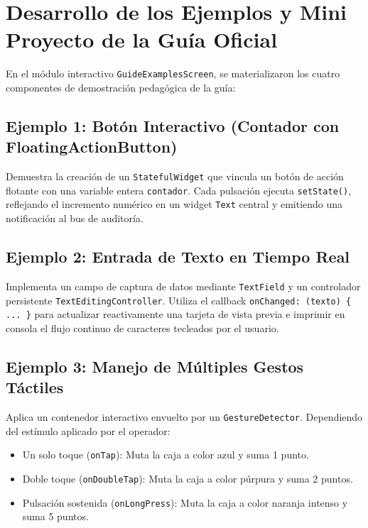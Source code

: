 \documentclass[12pt,a4paper]{article}
\begin{document}
  \section{Desarrollo de los Ejemplos y Mini Proyecto de la Guía Oficial}

  En el módulo interactivo \texttt{GuideExamplesScreen}, se materializaron los cuatro componentes de demostración pedagógica de la guía:

  \subsection{Ejemplo 1: Botón Interactivo (Contador con FloatingActionButton)}
  Demuestra la creación de un \texttt{StatefulWidget} que vincula un botón de acción flotante con una variable entera \texttt{contador}. Cada pulsación ejecuta \texttt{setState()}, reflejando el incremento numérico en un widget \texttt{Text} central y emitiendo una notificación al bus de auditoría.

  \subsection{Ejemplo 2: Entrada de Texto en Tiempo Real}
  Implementa un campo de captura de datos mediante \texttt{TextField} y un controlador persistente \texttt{TextEditingController}. Utiliza el callback \texttt{onChanged: (texto) \{ ... \}} para actualizar reactivamente una tarjeta de vista previa e imprimir en consola el flujo continuo de caracteres tecleados por el usuario.

  \subsection{Ejemplo 3: Manejo de Múltiples Gestos Táctiles}
  Aplica un contenedor interactivo envuelto por un \texttt{GestureDetector}. Dependiendo del estímulo aplicado por el operador:
  \begin{itemize}[leftmargin=*]
      \item Un solo toque (\texttt{onTap}): Muta la caja a color azul y suma 1 punto.
      \item Doble toque (\texttt{onDoubleTap}): Muta la caja a color púrpura y suma 2 puntos.
      \item Pulsación sostenida (\texttt{onLongPress}): Muta la caja a color naranja intenso y suma 5 puntos.
  \end{itemize}
\end{document}
